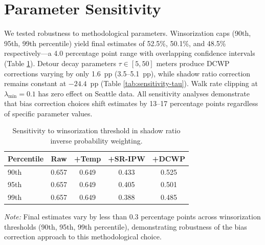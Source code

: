 \documentclass{ifacconf}
\begin{document}
\section{Parameter Sensitivity}
We tested robustness to methodological parameters. Winsorization caps (90th, 95th, 99th percentile) yield final estimates of 52.5\%, 50.1\%, and 48.5\% respectively---a 4.0 percentage point range with overlapping confidence intervals (Table \ref{tab:sensitivity-winsorization}). Detour decay parameters $\tau \in [5, 50]$ meters produce DCWP corrections varying by only 1.6~pp (3.5--5.1~pp), while shadow ratio correction remains constant at $-24.4$~pp (Table \ref{tab:sensitivity-tau}). Walk rate clipping at $\lambda_{\text{min}} = 0.1$ has zero effect on Seattle data. All sensitivity analyses demonstrate that bias correction choices shift estimates by 13--17 percentage points regardless of specific parameter values.
\begin{table}[t!]
\centering
\caption{Sensitivity to winsorization threshold in shadow ratio inverse probability weighting.}
\label{tab:sensitivity-winsorization}
\small
\begin{tabular}{@{}lcccc@{}}
\toprule
\textbf{Percentile} & \textbf{Raw} & \textbf{+Temp} & \textbf{+SR-IPW} & \textbf{+DCWP} \\
\midrule
90th & 0.657 & 0.649 & 0.433 & 0.525 \\
95th & 0.657 & 0.649 & 0.405 & 0.501 \\
99th & 0.657 & 0.649 & 0.388 & 0.485 \\
\bottomrule
\end{tabular}
\vspace{2pt}
\parbox{0.9\linewidth}{\footnotesize
\textit{Note:} Final estimates vary by less than 0.3 percentage points across winsorization thresholds (90th, 95th, 99th percentile), demonstrating robustness of the bias correction approach to this methodological choice.
}
\end{table}
\end{document}
